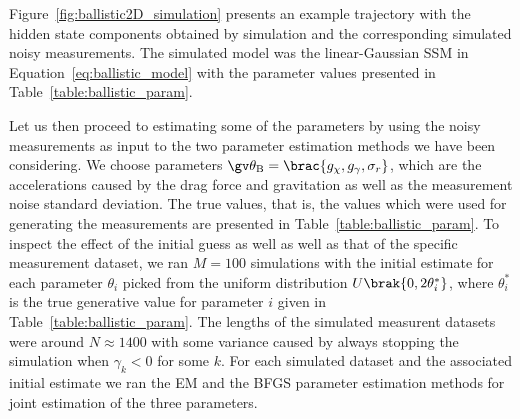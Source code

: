 Figure~\ref{fig:ballistic2D_simulation} presents an example trajectory with
the hidden state components obtained by simulation and the corresponding
simulated noisy measurements. The simulated model was the
linear-Gaussian SSM in Equation~\eqref{eq:ballistic_model} with  
the parameter values presented in Table~\ref{table:ballistic_param}.

\begin{table}[htbp]
\caption{Parameter values used for simulation in Section~\ref{sec:ballistic}}
\label{table:ballistic_param}
\centering
\footnotesize
{}
\end{table}

Let us then proceed to estimating some of the parameters by using the noisy
measurements as input to the two parameter estimation methods we have been considering.
We choose parameters $\Th_{\mathrm{B}}=\brac{g_\chi,g_\gamma,\sigma_r}$, which are the
accelerations caused by the drag force and gravitation as well as the measurement noise
standard deviation. The true values, that is, the values which were used for generating the
measurements are presented in Table~\ref{table:ballistic_param}. To inspect the effect of
the initial guess as well as well as that of the specific measurement dataset, we ran
$M=100$ simulations with the initial estimate for each parameter $\theta_i$ picked 
from the uniform distribution $U\brak{0,2\theta_i^*}$, where $\theta_i^*$ is the true generative value
for parameter $i$ given in Table~\ref{table:ballistic_param}. The lengths of
the simulated measurent datasets were around $N\approx 1400$ with some variance caused by always stopping
the simulation when $\gamma_k<0$ for some $k$. For each simulated dataset and the associated
initial estimate we ran the EM and the BFGS parameter estimation methods for joint estimation
of the three parameters. 


